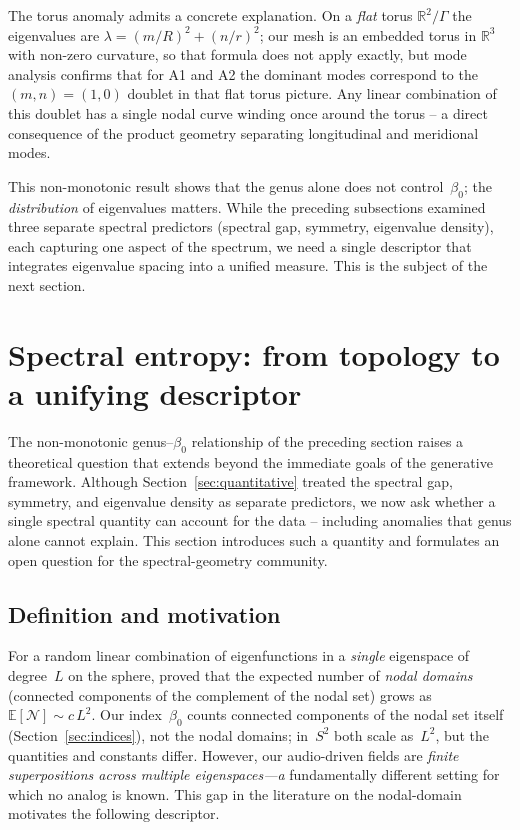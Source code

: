 \documentclass[]{interact}
\theoremstyle{plain}
\theoremstyle{definition}
\theoremstyle{remark}
\begin{document}
The torus anomaly admits a concrete explanation. On a \emph{flat} torus $\mathbb{R}^2/\Gamma$ the eigenvalues are $\lambda = (m/R)^2 + (n/r)^2$; our mesh is an embedded torus in $\mathbb{R}^3$ with non-zero curvature, so that formula does not apply exactly, but mode analysis confirms that for A1 and A2 the dominant modes correspond to the $(m,n)=(1,0)$ doublet in that flat torus picture. Any linear combination of this doublet has a single nodal curve winding once around the torus -- a direct consequence of the product geometry separating longitudinal and meridional modes.

This non-monotonic result shows that the genus alone does not control~$\beta_0$; the \emph{distribution} of eigenvalues matters. While the preceding subsections examined three separate spectral predictors (spectral gap, symmetry, eigenvalue density), each capturing one aspect of the spectrum, we need a single descriptor that integrates eigenvalue spacing into a unified measure. This is the subject of the next section.


\section{Spectral entropy: from topology to a unifying descriptor}
\label{sec:spectral_entropy}

The non-monotonic genus--$\beta_0$ relationship of the preceding section raises a theoretical question that extends beyond the immediate goals of the generative framework. Although Section~\ref{sec:quantitative} treated the spectral gap, symmetry, and eigenvalue density as separate predictors, we now ask whether a single spectral quantity can account for the data -- including anomalies that genus alone cannot explain. This section introduces such a quantity and formulates an open question for the spectral-geometry community.

\subsection{Definition and motivation}
\label{sec:entropy_def}

For a random linear combination of eigenfunctions in a \emph{single} eigenspace of degree~$L$ on the sphere, \citet{nazarov2009} proved that the expected number of \emph{nodal domains} (connected components of the complement of the nodal set) grows as $\mathbb{E}[\mathcal{N}] \sim c\,L^2$. Our index~$\beta_0$ counts connected components of the nodal set itself (Section~\ref{sec:indices}), not the nodal domains; in~$S^2$ both scale as~$L^2$, but the quantities and constants differ. However, our audio-driven fields are \emph{finite superpositions across multiple eigenspaces---a} fundamentally different setting for which no analog is known. This gap in the literature on the nodal-domain motivates the following descriptor.
\end{document}

